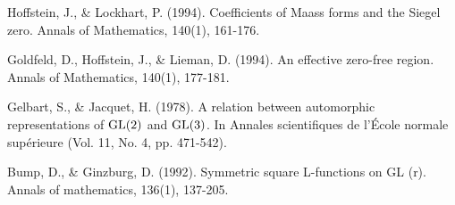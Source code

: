 \documentclass[12pt,reqno,oneside]{amsart}
\begin{document}
\begin{thebibliography}{99}
    Hoffstein, J., \& Lockhart, P. (1994). Coefficients of Maass forms and the Siegel zero. Annals of Mathematics, 140(1), 161-176.

    Goldfeld, D., Hoffstein, J., \& Lieman, D. (1994). An effective zero-free region. Annals of Mathematics, 140(1), 177-181.

    Gelbart, S., \& Jacquet, H. (1978). A relation between automorphic representations of ${\rm GL}(2) $ and ${\rm GL}(3) $. In Annales scientifiques de l'École normale supérieure (Vol. 11, No. 4, pp. 471-542).

    Bump, D., \& Ginzburg, D. (1992). Symmetric square L-functions on GL (r). Annals of mathematics, 136(1), 137-205.
\end{thebibliography}
\end{document}

